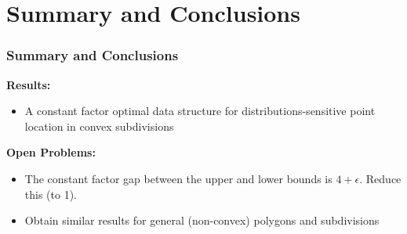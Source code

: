 \documentclass{beamer}
\begin{document}
\section{Summary and Conclusions}
\frame
{
	\frametitle{Summary and Conclusions}
	\textbf{Results:}
	\begin{itemize}
	\item<2-> A constant factor optimal data structure for
distributions-sensitive point location in convex subdivisions
	\end{itemize}
	\textbf{Open Problems:}
	\begin{itemize}
	\item<3-> The constant factor gap between the upper and lower
bounds is $4+\epsilon$.  Reduce this (to 1). 
	\item<4-> Obtain similar results for general (non-convex)
polygons and subdivisions
	\end{itemize}
}
\end{document}
